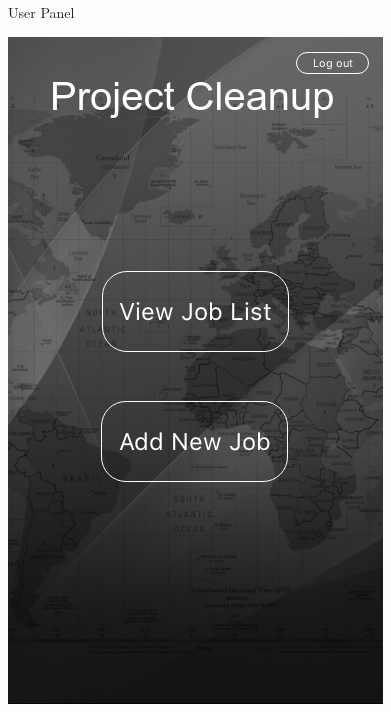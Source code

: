 \begin{figure}[!hb]
 
   \caption{User Panel}\label{fig:picture}
\end{figure}
\newpage
\begin{figure}[!hb]
   \centering

   \includegraphics[scale=0.5]{images/3.png}

\end{figure}
